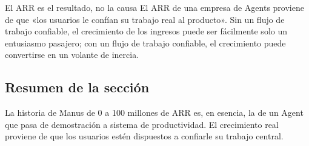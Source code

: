 \begin{importantbox}{El ARR es el resultado, no la causa}
El ARR de una empresa de Agents proviene de que «los usuarios le confían su trabajo real al producto». Sin un flujo de trabajo confiable, el crecimiento de los ingresos puede ser fácilmente solo un entusiasmo pasajero; con un flujo de trabajo confiable, el crecimiento puede convertirse en un volante de inercia.
\end{importantbox}

\subsection{Resumen de la sección}

La historia de Manus de 0 a 100 millones de ARR es, en esencia, la de un Agent que pasa de demostración a sistema de productividad. El crecimiento real proviene de que los usuarios estén dispuestos a confiarle su trabajo central.
